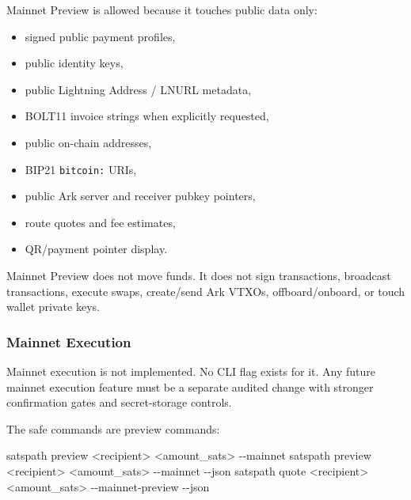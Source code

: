 \documentclass[
]{article}
\newenvironment{Shaded}{}{}
\newcommand{\AttributeTok}[1]{\textcolor[rgb]{0.49,0.56,0.16}{#1}}
\newcommand{\ExtensionTok}[1]{#1}
\newcommand{\NormalTok}[1]{#1}
\newcommand{\OperatorTok}[1]{\textcolor[rgb]{0.40,0.40,0.40}{#1}}
\providecommand{\tightlist}{%
  \setlength{\itemsep}{0pt}\setlength{\parskip}{0pt}}
\begin{document}
Mainnet Preview is allowed because it touches public data only:

\begin{itemize}
\tightlist
\item
  signed public payment profiles,
\item
  public identity keys,
\item
  public Lightning Address / LNURL metadata,
\item
  BOLT11 invoice strings when explicitly requested,
\item
  public on-chain addresses,
\item
  BIP21 \texttt{bitcoin:} URIs,
\item
  public Ark server and receiver pubkey pointers,
\item
  route quotes and fee estimates,
\item
  QR/payment pointer display.
\end{itemize}

Mainnet Preview does not move funds. It does not sign transactions,
broadcast transactions, execute swaps, create/send Ark VTXOs,
offboard/onboard, or touch wallet private keys.

\hypertarget{mainnet-execution}{%
\subsubsection{Mainnet Execution}\label{mainnet-execution}}

Mainnet execution is not implemented. No CLI flag exists for it. Any
future mainnet execution feature must be a separate audited change with
stronger confirmation gates and secret-storage controls.

The safe commands are preview commands:

\begin{Shaded}
\begin{Highlighting}[]
\ExtensionTok{satspath}\NormalTok{ preview }\OperatorTok{\textless{}}\NormalTok{recipient}\OperatorTok{\textgreater{}} \OperatorTok{\textless{}}\NormalTok{amount\_sats}\OperatorTok{\textgreater{}}\NormalTok{ {-}{-}mainnet}
\ExtensionTok{satspath}\NormalTok{ preview }\OperatorTok{\textless{}}\NormalTok{recipient}\OperatorTok{\textgreater{}} \OperatorTok{\textless{}}\NormalTok{amount\_sats}\OperatorTok{\textgreater{}}\NormalTok{ {-}{-}mainnet }\AttributeTok{{-}{-}json}
\ExtensionTok{satspath}\NormalTok{ quote }\OperatorTok{\textless{}}\NormalTok{recipient}\OperatorTok{\textgreater{}} \OperatorTok{\textless{}}\NormalTok{amount\_sats}\OperatorTok{\textgreater{}}\NormalTok{ {-}{-}mainnet{-}preview }\AttributeTok{{-}{-}json}
\end{Highlighting}
\end{Shaded}
\end{document}

